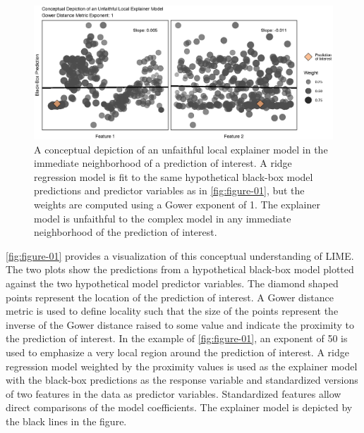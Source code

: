 \documentclass[AMS,STIX2COL]{WileyNJD-v2}\usepackage[]{graphicx}\usepackage[]{color}
\newenvironment{knitrout}{}{} %
\begin{document}
\begin{figure}[!thp]
\vspace*{\floatsep}
 
\begin{knitrout}
\color{fgcolor}

{\centering \includegraphics[width=6.5in]{figure-02-1} 

}



\end{knitrout}
\caption{A conceptual depiction of an unfaithful local explainer model in the immediate neighborhood of a prediction of interest. A ridge regression model is fit to the same hypothetical black-box model predictions and predictor variables as in \autoref{fig:figure-01}, but the weights are computed using a Gower exponent of 1. The explainer model is unfaithful to the complex model in any immediate neighborhood of the prediction of interest.}
\label{fig:figure-02}
\end{figure}

\autoref{fig:figure-01} provides a visualization of this conceptual understanding of LIME. The two plots show the predictions from a hypothetical black-box model plotted against the two hypothetical model predictor variables. The diamond shaped points represent the location of the prediction of interest. A Gower distance metric \citep{gower:1971} is used to define locality such that the size of the points represent the inverse of the Gower distance raised to some value and indicate the proximity to the prediction of interest. In the example of \autoref{fig:figure-01}, an exponent of 50 is used to emphasize a very local region around the prediction of interest. A ridge regression model weighted by the proximity values is used as the explainer model with the black-box predictions as the response variable and standardized versions of two features in the data as predictor variables. Standardized features allow direct comparisons of the model coefficients. The explainer model is depicted by the black lines in the figure.
\end{document}
